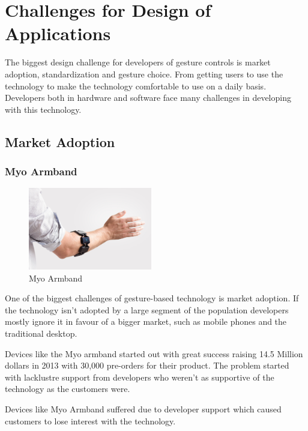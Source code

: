 \chapter{Challenges for Design of Applications}

The biggest design challenge for developers of gesture controls is market adoption, standardization and gesture choice. From getting users to use the technology to make the technology comfortable to use on a daily basis. Developers both in hardware and software face many challenges in developing with this technology.

\section{Market Adoption}

\subsection{Myo Armband}

\begin{figure}
  \begin{center}
    \includegraphics[width=0.48\textwidth]{img/myo.jpg}
  \end{center}
  \caption{Myo Armband}
\end{figure}

One of the biggest challenges of gesture-based technology is market adoption. If the technology isn't adopted by a large segment of the population developers mostly ignore it in favour of a bigger market, such as mobile phones and the traditional desktop.

Devices like the Myo armband started out with great success raising 14.5 Million dollars in 2013 with 30,000 pre-orders for their product. The problem started with lacklustre support from developers who weren't as supportive of the technology as the customers were. \cite{myosales}

Devices like Myo Armband suffered due to developer support which caused customers to lose interest with the technology.


